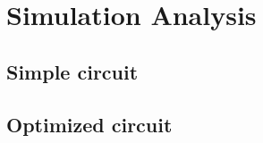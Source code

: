 \newpage

\section{Simulation Analysis}
\label{sec:simulation}

\subsection{Simple circuit}

\subsection{Optimized circuit}
